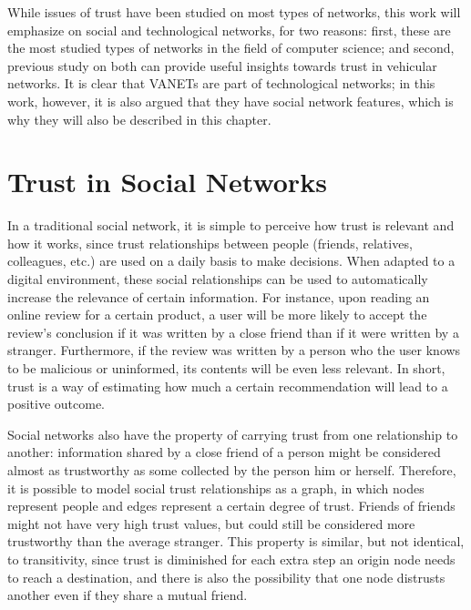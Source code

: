 While issues of trust have been studied on most types of networks, this work will emphasize on social and technological networks, for two reasons: first, these are the most studied types of networks in the field of computer science; and second, previous study on both can provide useful insights towards trust in vehicular networks.
It is clear that VANETs are part of technological networks; in this work, however, it is also argued that they have social network features, which is why they will also be described in this chapter. 


\section{Trust in Social Networks}
\label{section:trustsocial}
In a traditional social network, it is simple to perceive how trust is relevant and how it works, since trust relationships between people (friends, relatives, colleagues, etc.) are used on a daily basis to make decisions.
When adapted to a digital environment, these social relationships can be used to automatically increase the relevance of certain information.
For instance, upon reading an online review for a certain product, a user will be more likely to accept the review's conclusion if it was written by a close friend than if it were written by a stranger.
Furthermore, if the review was written by a person who the user knows to be malicious or uninformed, its contents will be even less relevant.
In short, trust is a way of estimating how much a certain recommendation will lead to a positive outcome. \cite{golbeck2006inferring}

Social networks also have the property of carrying trust from one relationship to another:
information shared by a close friend of a person might be considered almost as trustworthy as some collected by the person him or herself.
Therefore, it is possible to model social trust relationships as a graph, in which nodes represent people and edges represent a certain degree of trust.
Friends of friends \cite{boissevain1974friends} might not have very high trust values, but could still be considered more trustworthy than the average stranger.
This property is similar, but not identical, to transitivity, since trust is diminished for each extra step an origin node needs to reach a destination, and there is also the possibility that one node distrusts another even if they share a mutual friend.


